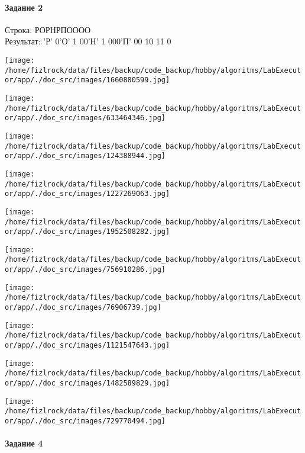 \documentclass[a4paper, 12pt]{article}
\begin{document}
\paragraph{Задание 2}

Строка: 
РОРНРПОООО\\
Результат: 'Р' 0'О' 1 00'Н' 1 000'П' 00 10 11 0

\texttt{[image: /home/fizlrock/data/files/backup/code\_backup/hobby/algoritms/LabExecutor/app/./doc\_src/images/1660880599.jpg]}

\texttt{[image: /home/fizlrock/data/files/backup/code\_backup/hobby/algoritms/LabExecutor/app/./doc\_src/images/633464346.jpg]}

\texttt{[image: /home/fizlrock/data/files/backup/code\_backup/hobby/algoritms/LabExecutor/app/./doc\_src/images/124388944.jpg]}

\texttt{[image: /home/fizlrock/data/files/backup/code\_backup/hobby/algoritms/LabExecutor/app/./doc\_src/images/1227269063.jpg]}

\texttt{[image: /home/fizlrock/data/files/backup/code\_backup/hobby/algoritms/LabExecutor/app/./doc\_src/images/1952508282.jpg]}

\texttt{[image: /home/fizlrock/data/files/backup/code\_backup/hobby/algoritms/LabExecutor/app/./doc\_src/images/756910286.jpg]}

\texttt{[image: /home/fizlrock/data/files/backup/code\_backup/hobby/algoritms/LabExecutor/app/./doc\_src/images/76906739.jpg]}

\texttt{[image: /home/fizlrock/data/files/backup/code\_backup/hobby/algoritms/LabExecutor/app/./doc\_src/images/1121547643.jpg]}

\texttt{[image: /home/fizlrock/data/files/backup/code\_backup/hobby/algoritms/LabExecutor/app/./doc\_src/images/1482589829.jpg]}

\texttt{[image: /home/fizlrock/data/files/backup/code\_backup/hobby/algoritms/LabExecutor/app/./doc\_src/images/729770494.jpg]}
\pagebreak
\paragraph{Задание 4}
\end{document}
